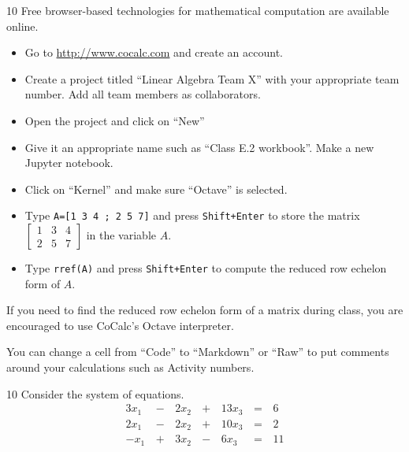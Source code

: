 
\begin{applicationActivities}


\begin{activity}{10}
Free browser-based technologies for mathematical computation
are available online.
\begin{itemize}
\item Go to \url{http://www.cocalc.com} and create an account.
\item Create a project titled ``Linear Algebra Team X'' with your appropriate
      team number.  Add all team members as collaborators.
\item Open the project and click on ``New''
\item Give it an appropriate name such as ``Class E.2 workbook''.  Make a new
      Jupyter notebook.
\item Click on ``Kernel'' and make sure ``Octave'' is selected.
\item Type \texttt{A=[1 3 4 ; 2 5 7]} and press \texttt{Shift+Enter}
      to store the matrix
      \(\begin{bmatrix} 1 & 3 & 4 \\ 2 & 5 & 7\end{bmatrix}\)
      in the variable $A$.
\item Type \texttt{rref(A)} and press \texttt{Shift+Enter}
      to compute the reduced row echelon form of $A$.
\end{itemize}
\end{activity}

\begin{remark}
If you need to find the reduced row echelon form of a matrix during class, you
are encouraged to use CoCalc's Octave interpreter.

\vspace{0.2in}

You can change a cell from ``Code'' to ``Markdown'' or ``Raw'' to put comments
around your calculations such as Activity numbers.
\end{remark}

\begin{activity}{10}
Consider the system of equations.
 \[
		\begin{alignedat}{4}
   		  3x_1 &\,-\,& 2x_2 &\,+\,& 13x_3 &\,=\,& 6 \\
   		  2x_1 &\,-\,& 2x_2 &\,+\,& 10x_3 &\,=\,& 2 \\
   		  -x_1 &\,+\,& 3x_2 &\,-\,&  6x_3 &\,=\,& 11
   		\end{alignedat}
\]


\end{activity}
\end{applicationActivities}
